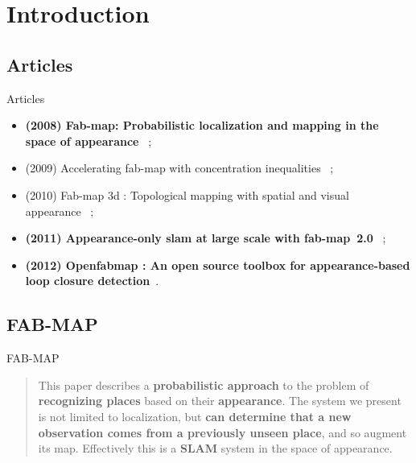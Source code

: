 \section{Introduction}


\subsection{Articles}
\begin{frame}{Articles}
    \leftmargini=0pt
    \begin{itemize}
        \item \textbf{(2008) Fab-map: Probabilistic localization and mapping in the space of appearance}~\cite{fabmap2008b} ;
        \item (2009) Accelerating fab-map with concentration inequalities~\cite{accelerating} ;
        \item (2010) Fab-map 3d : Topological mapping with spatial and visual appearance~\cite{fabmap3d} ;
        \item \textbf{(2011) Appearance-only slam at large scale with fab-map~2.0}~\cite{fabmap2011} ;
        \item \textbf{(2012) Openfabmap : An open source toolbox for appearance-based loop closure detection}~\cite{openfabmap}.
    \end{itemize}
\end{frame}

\subsection{FAB-MAP}
\begin{frame}{FAB-MAP}
    \begin{quotation}
        This paper describes a \textbf{probabilistic approach} to the problem of \textbf{recognizing places} based on their \textbf{appearance}. The system we present is not limited to localization, but \textbf{can determine that a new observation comes from a previously unseen place}, and so augment its map. Effectively this is a \textbf{SLAM} system in the space of appearance.~\cite{fabmap2008b}
    \end{quotation}
\end{frame}

